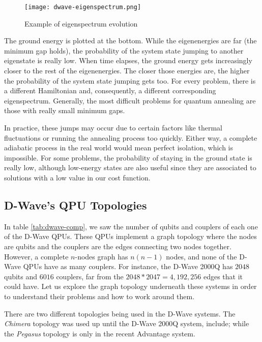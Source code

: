 \begin{figure}[h]
	\texttt{[image: dwave-eigenspectrum.png]}
	\centering
	\caption{Example of eigenspectrum evolution \cite{DWaveDoc-QuantumAnnealing}}
	\label{fig:dwave-eigenspectrum}
\end{figure}

The ground energy is plotted at the bottom. While the eigenenergies are far (the minimum gap holds), the probability of the system state jumping to another eigenstate is really low. When time elapses, the ground energy gets increasingly closer to the rest of the eigenenergies. The closer those energies are, the higher the probability of the system state jumping gets too. For every problem, there is a different Hamiltonian and, consequently, a different corresponding eigenspectrum. Generally, the most difficult problems for quantum annealing are those with really small minimum gaps.

In practice, these jumps may occur due to certain factors like thermal fluctuations or running the annealing process too quickly. Either way, a complete adiabatic process in the real world would mean perfect isolation, which is impossible. For some problems, the probability of staying in the ground state is really low, although low-energy states are also useful since they are associated to solutions with a low value in our cost function.


\subsection{D-Wave's QPU Topologies}
\label{sec:topologies}


In table \ref{tab:dwave-comp}, we saw the number of qubits and couplers of each one of the D-Wave QPUs. These QPUs implement a graph topology where the nodes are qubits and the couplers are the edges connecting two nodes together. However, a complete $n$-nodes graph has $n(n-1)$ nodes, and none of the D-Wave QPUs have as many couplers. For instance, the D-Wave 2000Q has $2048$ qubits and $6016$ couplers, far from the $2048 * 2047 = 4,192,256$ edges that it could have. Let us explore the graph topology underneath these systems in order to understand their problems and how to work around them.

There are two different topologies being used in the D-Wave systems. The \emph{Chimera} topology was used up until the D-Wave 2000Q system, include; while the \emph{Pegasus} topology is only in the recent Advantage system. 

